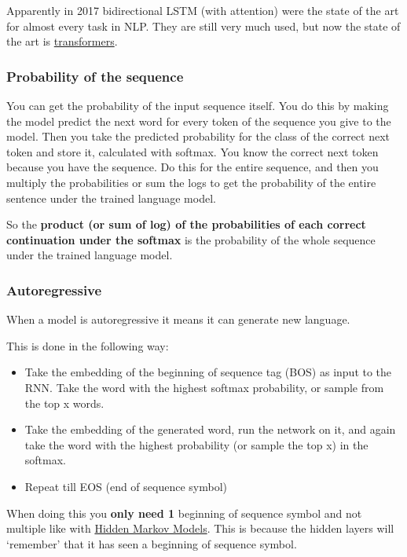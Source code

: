 \documentclass[
  11pt,
  british,
]{article}
\providecommand{\tightlist}{%
  \setlength{\itemsep}{0pt}\setlength{\parskip}{0pt}}
\begin{document}
Apparently in 2017 bidirectional LSTM (with attention) were the state of
the art for almost every task in NLP. They are still very much used, but
now the state of the art is
\href{Prediction/Transformers.md}{transformers}.

\hypertarget{probability-of-the-sequence}{%
\subsubsection{Probability of the
sequence}\label{probability-of-the-sequence}}

You can get the probability of the input sequence itself. You do this by
making the model predict the next word for every token of the sequence
you give to the model. Then you take the predicted probability for the
class of the correct next token and store it, calculated with softmax.
You know the correct next token because you have the sequence. Do this
for the entire sequence, and then you multiply the probabilities or sum
the logs to get the probability of the entire sentence under the trained
language model.

So the \textbf{product (or sum of log) of the probabilities of each
correct continuation under the softmax} is the probability of the whole
sequence under the trained language model.

\hypertarget{autoregressive}{%
\subsubsection{Autoregressive}\label{autoregressive}}

When a model is autoregressive it means it can generate new language.

This is done in the following way:

\begin{itemize}
\tightlist
\item
  Take the embedding of the beginning of sequence tag (BOS) as input to
  the RNN. Take the word with the highest softmax probability, or sample
  from the top x words.
\item
  Take the embedding of the generated word, run the network on it, and
  again take the word with the highest probability (or sample the top x)
  in the softmax.
\item
  Repeat till EOS (end of sequence symbol)
\end{itemize}

When doing this you \textbf{only need 1} beginning of sequence symbol
and not multiple like with
\href{Prediction/Hidden\%20Markov\%20Models.md}{Hidden Markov Models}.
This is because the hidden layers will `remember' that it has seen a
beginning of sequence symbol.
\end{document}
